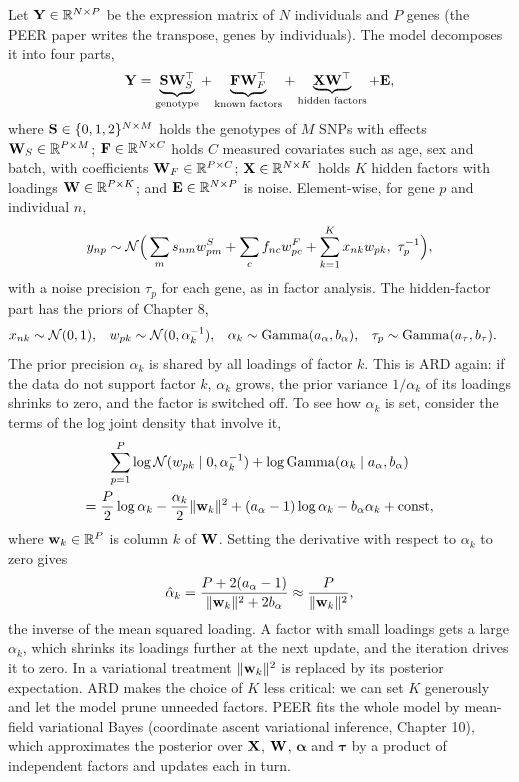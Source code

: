 Let $\mathbf{Y}\in\mathbb{R}^{N\times P}$ be the expression matrix of $N$ individuals and $P$ genes (the PEER paper writes the transpose, genes by individuals). The model decomposes it into four parts,
\begin{equation}
  \mathbf{Y} = \underbrace{\mathbf{S}\mathbf{W}_S^\top}_{\text{genotype}} + \underbrace{\mathbf{F}\mathbf{W}_F^\top}_{\text{known factors}} + \underbrace{\mathbf{X}\mathbf{W}^\top}_{\text{hidden factors}} + \mathbf{E},
  \label{eq:peer}
\end{equation}
where $\mathbf{S}\in\{0,1,2\}^{N\times M}$ holds the genotypes of $M$ SNPs with effects $\mathbf{W}_S\in\mathbb{R}^{P\times M}$; $\mathbf{F}\in\mathbb{R}^{N\times C}$ holds $C$ measured covariates such as age, sex and batch, with coefficients $\mathbf{W}_F\in\mathbb{R}^{P\times C}$; $\mathbf{X}\in\mathbb{R}^{N\times K}$ holds $K$ hidden factors with loadings $\mathbf{W}\in\mathbb{R}^{P\times K}$; and $\mathbf{E}\in\mathbb{R}^{N\times P}$ is noise. Element-wise, for gene $p$ and individual $n$,
\begin{equation}
  y_{np}\sim\Normal\Big(\sum_m s_{nm}w^S_{pm}+\sum_c f_{nc}w^F_{pc}+\sum_{k=1}^K x_{nk}w_{pk},\ \tau_p^{-1}\Big),
\end{equation}
with a noise precision $\tau_p$ for each gene, as in factor analysis. The hidden-factor part has the priors of Chapter 8,
\begin{align}
  x_{nk}&\sim\mathcal{N}(0,1), & w_{pk}&\sim\mathcal{N}(0,\alpha_k^{-1}), & \alpha_k&\sim\operatorname{Gamma}(a_\alpha,b_\alpha), & \tau_p&\sim\operatorname{Gamma}(a_\tau,b_\tau).
  \label{eq:peer_priors}
\end{align}
The prior precision $\alpha_k$ is shared by all loadings of factor $k$. This is ARD again: if the data do not support factor $k$, $\alpha_k$ grows, the prior variance $1/\alpha_k$ of its loadings shrinks to zero, and the factor is switched off. To see how $\alpha_k$ is set, consider the terms of the log joint density that involve it,
\begin{multline}
  \sum_{p=1}^P\log\mathcal{N}(w_{pk}\mid0,\alpha_k^{-1}) + \log\operatorname{Gamma}(\alpha_k\mid a_\alpha,b_\alpha) \\ = \frac{P}{2}\log\alpha_k - \frac{\alpha_k}{2}\|\mathbf{w}_k\|^2 + (a_\alpha-1)\log\alpha_k - b_\alpha\alpha_k + \text{const},
\end{multline}
where $\mathbf{w}_k\in\mathbb{R}^P$ is column $k$ of $\mathbf{W}$. Setting the derivative with respect to $\alpha_k$ to zero gives
\begin{equation}
  \hat\alpha_k = \frac{P+2(a_\alpha-1)}{\|\mathbf{w}_k\|^2+2b_\alpha}\approx\frac{P}{\|\mathbf{w}_k\|^2},
\end{equation}
the inverse of the mean squared loading. A factor with small loadings gets a large $\alpha_k$, which shrinks its loadings further at the next update, and the iteration drives it to zero. In a variational treatment $\|\mathbf{w}_k\|^2$ is replaced by its posterior expectation. ARD makes the choice of $K$ less critical: we can set $K$ generously and let the model prune unneeded factors. PEER fits the whole model by mean-field variational Bayes (coordinate ascent variational inference, Chapter 10), which approximates the posterior over $\mathbf{X}$, $\mathbf{W}$, $\boldsymbol{\alpha}$ and $\boldsymbol{\tau}$ by a product of independent factors and updates each in turn.

